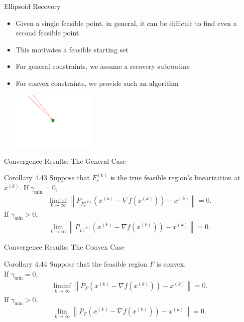 \documentclass{beamer}
\newcommand{\xk}{{{x}^{(k)}}}
\begin{document}
\begin{frame}{Ellipsoid Recovery}
\begin{itemize}
	\item Given a single feasible point, in general, it can be difficult to find even a second feasible point
	\item This motivates a feasible starting set
	\item For general constraints, we assume a recovery subroutine
	\item For convex constraints, we provide such an algorithm
	\begin{center}
		\includegraphics[width=150px]{images/only_one_feasible_point.png}
	\end{center}
\end{itemize}
\end{frame}

\begin{frame}{Convergence Results: The General Case}
\begin{block}{Corollary 4.43}
Suppose that $F_c^{(k)}$ is the true feasible region's linearization at $\xk$.
If $\gamma_{\textrm{min}} = 0$,
\begin{align*}
\liminf_{k\to\infty} \left\|P_{F_c^{(k)}}\left(\xk - \nabla f\left(\xk\right)\right) - \xk\right\| = 0.
\end{align*}
If $\gamma_{\textrm{min}} > 0$,
\begin{align*}
\lim_{k\to\infty} \left\|P_{F_c^{(k)}}\left(\xk - \nabla f\left(\xk\right)\right) - \xk\right\| = 0.
\end{align*}
\end{block}
\end{frame}

\begin{frame}{Convergence Results: The Convex Case}
\begin{block}{Corollary 4.44}
Suppose that the feasible region $F$ is convex. \\
If $\gamma_{\textrm{min}} = 0$,
\begin{align*}
\liminf_{k\to\infty} \left\|P_F\left(\xk - \nabla f\left(\xk\right)\right) - \xk\right\| = 0.
\end{align*}
If $\gamma_{\textrm{min}} > 0$,
\begin{align*}
\lim_{k\to\infty} \left\|P_F\left(\xk - \nabla f\left(\xk\right)\right) - \xk\right\| = 0.
\end{align*}
\end{block}
\end{frame}
\end{document}
